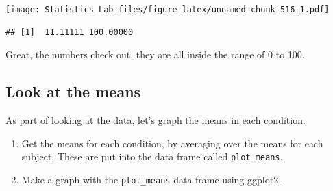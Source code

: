 \documentclass[
]{book}
\newenvironment{Shaded}{\begin{snugshade}}{\end{snugshade}}
\newcommand{\FunctionTok}[1]{\textcolor[rgb]{0.00,0.00,0.00}{#1}}
\newcommand{\NormalTok}[1]{#1}
\newcommand{\SpecialCharTok}[1]{\textcolor[rgb]{0.00,0.00,0.00}{#1}}
\begin{document}
\begin{Shaded}
\end{Shaded}

\texttt{[image: Statistics\_Lab\_files/figure-latex/unnamed-chunk-516-1.pdf]}

\begin{Shaded}
\end{Shaded}

\begin{verbatim}
## [1]  11.11111 100.00000
\end{verbatim}

Great, the numbers check out, they are all inside the range of 0 to 100.

\hypertarget{look-at-the-means-2}{%
\subsection{Look at the means}\label{look-at-the-means-2}}

As part of looking at the data, let's graph the means in each condition.

\begin{enumerate}
\def\labelenumi{\arabic{enumi}.}
\item
  Get the means for each condition, by averaging over the means for each subject. These are put into the data frame called \texttt{plot\_means}.
\item
  Make a graph with the \texttt{plot\_means} data frame using ggplot2.
\end{enumerate}
\end{document}
